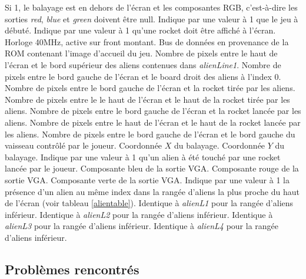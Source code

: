 \documentclass[french]{nakrule}
\begin{document}
\begin{descr}
   Si 1, le balayage est en dehors de l'écran et les
  composantes RGB, c'est-à-dire les sorties \emph{red}, \emph{blue} et
  \emph{green} doivent être null.
   Indique par une valeur à 1 que le jeu à débuté.
   Indique par une valeur à 1 qu'une rocket doit être
  affiché à l'écran.
   Horloge 40MHz, active sur front montant.
   Bus de données en provenance de la ROM contenant
  l'image d'accueil du jeu.
   Nombre de pixels entre le haut de l'écran et le bord
  supérieur des aliens contenues dans \emph{alienLine1}.
   Nombre de pixels entre le bord gauche de l'écran et le
  board droit des aliens à l'index 0.
   Nombre de pixels entre le bord gauche de l'écran et
  la rocket tirée par les aliens.
   Nombre de pixels entre le le haut de l'écran et le
  haut de la rocket tirée par les aliens.
   Nombre de pixels entre le bord gauche de l'écran et la rocket
  lancée par les aliens.
   Nombre de pixels entre le haut de l'écran et le haut de la rocket
  lancée par les aliens.
   Nombre de pixels entre le bord gauche de l'écran et
  le bord gauche du vaisseau contrôlé par le joueur.
   Coordonnée $X$ du balayage.
   Coordonnée $Y$ du balayage.
   Indique par une valeur à 1 qu'un alien à été touché
  par une rocket lancée par le joueur.
   Composante bleu de la sortie VGA.
   Composante rouge de la sortie VGA.
   Composante verte de la sortie VGA.
   Indique par une valeur à 1 la présence d'un alien au même
  index dans la rangée d'aliens la plus proche du haut de l'écran (voir tableau
  \ref{alientable}).
   Identique à \emph{alienL1} pour la rangée d'aliens inférieur.
   Identique à \emph{alienL2} pour la rangée d'aliens inférieur.
   Identique à \emph{alienL3} pour la rangée d'aliens inférieur.
   Identique à \emph{alienL4} pour la rangée d'aliens inférieur.
\end{descr}

\subsection{Problèmes rencontrés}
\label{subsec:Problèmes_rencontrés_alienRocket}
\end{document}
